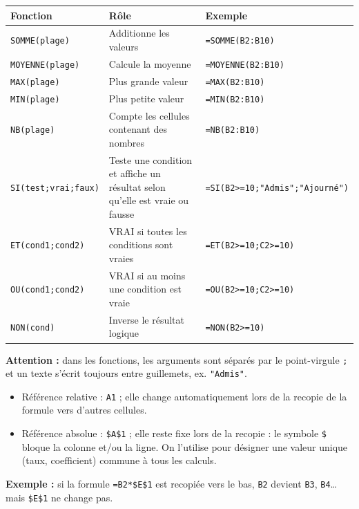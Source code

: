 \documentclass[11pt]{article}
\newcommand{\cle}[1]{{\popxbold\color{popdark}#1}}
\begin{document}
\begin{aretenir}
\begin{center}
\begin{tabularx}{\linewidth}{|l|X|l|}
\hline
\rowcolor{popblueL} \textbf{Fonction} & \textbf{Rôle} & \textbf{Exemple} \\
\hline
\texttt{SOMME(plage)} & Additionne les valeurs & \texttt{=SOMME(B2:B10)} \\
\hline
\texttt{MOYENNE(plage)} & Calcule la moyenne & \texttt{=MOYENNE(B2:B10)} \\
\hline
\texttt{MAX(plage)} & Plus grande valeur & \texttt{=MAX(B2:B10)} \\
\hline
\texttt{MIN(plage)} & Plus petite valeur & \texttt{=MIN(B2:B10)} \\
\hline
\texttt{NB(plage)} & Compte les cellules contenant des nombres & \texttt{=NB(B2:B10)} \\
\hline
\texttt{SI(test;vrai;faux)} & Teste une condition et affiche un résultat selon qu'elle est vraie ou fausse & \texttt{=SI(B2>=10;"Admis";"Ajourné")} \\
\hline
\texttt{ET(cond1;cond2)} & VRAI si toutes les conditions sont vraies & \texttt{=ET(B2>=10;C2>=10)} \\
\hline
\texttt{OU(cond1;cond2)} & VRAI si au moins une condition est vraie & \texttt{=OU(B2>=10;C2>=10)} \\
\hline
\texttt{NON(cond)} & Inverse le résultat logique & \texttt{=NON(B2>=10)} \\
\hline
\end{tabularx}
\end{center}
\textbf{Attention :} dans les fonctions, les arguments sont séparés par le point-virgule \texttt{;} et un texte s'écrit toujours entre guillemets, ex. \texttt{"Admis"}.
\end{aretenir}

\begin{aretenir}
\begin{itemize}
  \item \cle{Référence relative} : \texttt{A1} ; elle change automatiquement lors de la recopie de la formule vers d'autres cellules.
  \item \cle{Référence absolue} : \texttt{\$A\$1} ; elle reste fixe lors de la recopie : le symbole \texttt{\$} bloque la colonne et/ou la ligne. On l'utilise pour désigner une valeur unique (taux, coefficient) commune à tous les calculs.
\end{itemize}
\textbf{Exemple :} si la formule \texttt{=B2*\$E\$1} est recopiée vers le bas, \texttt{B2} devient \texttt{B3}, \texttt{B4}\ldots{} mais \texttt{\$E\$1} ne change pas.
\end{aretenir}
\end{document}
